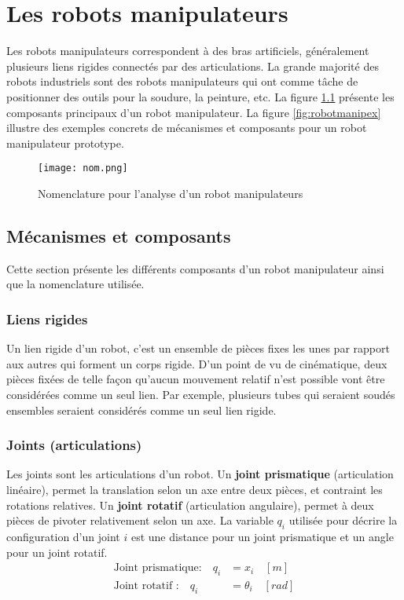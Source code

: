 \chapter{Les robots manipulateurs}
\label{sec:robotmanip}

Les robots manipulateurs correspondent à des bras artificiels, généralement plusieurs liens rigides connectés par des articulations. La grande majorité des robots industriels sont des robots manipulateurs qui ont comme tâche de positionner des outils pour la soudure, la peinture, etc. La figure \ref{fig:nom} présente les composants principaux d'un robot manipulateur. La figure \ref{fig:robotmanipex} illustre des exemples concrets de mécanismes et composants pour un robot manipulateur prototype. 

\begin{figure}[H]
	\centering
		\texttt{[image: nom.png]}
	\caption{Nomenclature pour l'analyse d'un robot manipulateurs}
	\label{fig:nom}
\end{figure}

\section{Mécanismes et composants}

Cette section présente les différents composants d'un robot manipulateur ainsi que la nomenclature utilisée. 

\subsection{Liens rigides}

Un lien rigide d'un robot, c'est un ensemble de pièces fixes les unes par rapport aux autres qui forment un corps rigide. D'un point de vu de cinématique, deux pièces fixées de telle façon qu'aucun mouvement relatif n'est possible vont être considérées comme un seul lien. Par exemple, plusieurs tubes qui seraient soudés ensembles seraient considérés comme un seul lien rigide. 

\subsection{Joints (articulations)}

Les joints sont les articulations d'un robot. Un \textbf{joint prismatique} (articulation linéaire), permet la translation selon un axe entre deux pièces, et contraint les rotations relatives. Un \textbf{joint rotatif} (articulation angulaire), permet à deux pièces de pivoter relativement selon un axe. La variable $q_i$ utilisée pour décrire la configuration d'un joint $i$ est une distance pour un joint prismatique et un angle pour un joint rotatif.
\begin{align}
\text{Joint prismatique:} \quad q_i &= x_i      \quad [m] \\
\text{Joint rotatif    :} \quad q_i &= \theta_i \quad [rad]
\end{align} 

